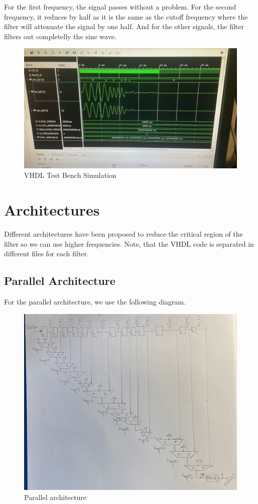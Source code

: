 \documentclass[a4paper, 12pt]{article}
\begin{document}
For the first frequency, the signal passes without a problem. For the second frequency, it reduces by half as it is the same as the cutoff frequency where the filter will attenuate the signal by one half. And for the other signals, the filter filters out completelly the sine wave.

\begin{figure}[htbp]
\centering
\includegraphics[width=.9\linewidth]{./img/simulation.jpg}
\caption{VHDL Test Bench Simulation}
\end{figure}
\section{Architectures}
\label{sec:org7398c78}

Different architectures have been proposed to reduce the critical region of the filter so we can use higher frequencies. Note, that the VHDL code is separated in different files for each filter.
\subsection{Parallel Architecture}
\label{sec:org72c1f84}

For the parallel architecture, we use the following diagram.

\begin{figure}[htbp]
\centering
\includegraphics[width=.9\linewidth]{./img/architecture_parallel.jpg}
\caption{Parallel architecture}
\end{figure}
\end{document}
